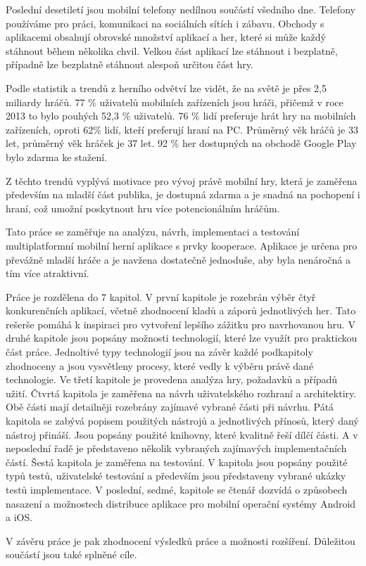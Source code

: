 \begin{introduction}
Poslední desetiletí jsou mobilní telefony nedílnou součástí všedního dne.
Telefony používáme pro práci, komunikaci na sociálních sítích i zábavu.
Obchody s aplikacemi obsahují obrovské množství aplikací a her,
které si může každý stáhnout během několika chvil.
Velkou část aplikací lze stáhnout i bezplatně,
případně lze bezplatně stáhnout alespoň určitou část hry.

Podle statistik a trendů z herního odvětví \cite{wepc_video_games} lze vidět,
že na světě je přes 2,5 miliardy hráčů.
77 \% uživatelů mobilních zařízeních jsou hráči,
přičemž v roce 2013 to bylo pouhých 52,3 \% uživatelů.
76 \% lidí preferuje hrát hry na mobilních zařízeních,
oproti 62\% lidí, kteří preferují hraní na PC.
Průměrný věk hráčů je 33 let, průměrný věk hráček je 37 let.
92 \% her dostupných na obchodě Google Play bylo zdarma ke stažení.

Z těchto trendů vyplývá motivace pro vývoj právě mobilní hry,
která je zaměřena především na mladší část publika,
je dostupná zdarma a je snadná na pochopení i hraní,
což umožní poskytnout hru více potencionálním hráčům.

Tato práce se zaměřuje na analýzu, návrh, implementaci a testování
multiplatformní mobilní herní aplikace s prvky kooperace.
Aplikace je určena pro převážně mladší hráče
a je navžena dostatečně jednoduše,
aby byla nenáročná a tím více atraktivní.

Práce je rozdělena do 7 kapitol.
V první kapitole je rozebrán výběr čtyř konkurenčních aplikací,
včetně zhodnocení kladů a záporů jednotlivých her.
Tato rešerše pomáhá k inspiraci pro vytvoření lepšího zážitku pro navrhovanou
hru.
V druhé kapitole jsou popsány možnosti technologií,
které lze využít pro praktickou část práce.
Jednoltivé typy technologií jsou na závěr každé podkapitoly zhodnoceny
a jsou vysvětleny procesy, které vedly k výběru právě dané technologie.
Ve třetí kapitole je provedena analýza hry, požadavků a případů užití.
Čtvrtá kapitola je zaměřena na návrh uživatelského rozhraní a architektiry.
Obě části mají detailněji rozebrány zajímavé vybrané části při návrhu.
Pátá kapitola se zabývá popisem použitých nástrojů
a jednotlivých přínosů, který daný nástroj přináší.
Jsou popsány použité knihovny, které kvalitně řeší dílčí části.
A v neposlední řadě je představeno několik vybraných zajímavých
implementačních částí.
Šestá kapitola je zaměřena na testování.
V kapitola jsou popsány použité typů testů,
uživatelské testování a především jsou představeny vybrané ukázky testů
implementace.
V poslední, sedmé, kapitole se čtenář dozvídá o způsobech nasazení a
možnostech distribuce aplikace pro mobilní operační systémy Android a iOS.

V závěru práce je pak zhodnocení výsledků práce a možnosti rozšíření.
Důležitou součástí jsou také splněné cíle.
\end{introduction}
